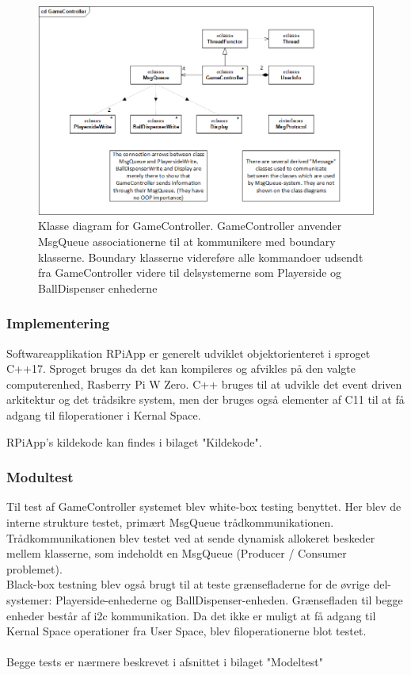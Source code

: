 \documentclass[Rapport/Rapport_main.tex]{subfiles}
\begin{document}
\begin{figure}[H]
    \centering
    \includegraphics[width=1\textwidth]{Rapport/RPi/graphics/GameController.png}
    \caption{Klasse diagram for GameController. GameController anvender MsgQueue associationerne til at kommunikere med boundary klasserne. Boundary klasserne videreføre alle kommandoer udsendt fra GameController videre til delsystemerne som Playerside og BallDispenser enhederne}
   \label{fig:cd_GameController}
\end{figure}

\subsubsection{Implementering}
Softwareapplikation RPiApp er generelt udviklet objektorienteret i sproget C++17. Sproget bruges da det kan kompileres og afvikles på den valgte computerenhed, Rasberry Pi W Zero. C++ bruges til at udvikle det event driven arkitektur og det trådsikre system, men der bruges også elementer af C11 til at få adgang til filoperationer i Kernal Space.

RPiApp's kildekode kan findes i bilaget "Kildekode".

\subsubsection{Modultest}
Til test af GameController systemet blev white-box testing benyttet. Her blev de interne strukture testet, primært MsgQueue trådkommunikationen. Trådkommunikationen blev testet ved at sende dynamisk allokeret beskeder mellem klasserne, som indeholdt en MsgQueue (Producer / Consumer problemet). \\
Black-box testning blev også brugt til at teste grænsefladerne for de øvrige del-systemer: Playerside-enhederne og BallDispenser-enheden. Grænsefladen til begge enheder består af i2c kommunikation. Da det ikke er muligt at få adgang til Kernal Space operationer fra User Space, blev filoperationerne blot testet. \\\\
Begge tests er nærmere beskrevet i afsnittet  i bilaget "Modeltest"
\end{document}
